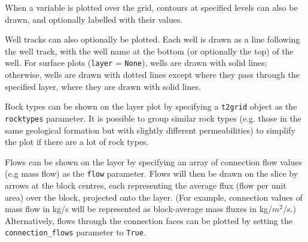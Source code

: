When a variable is plotted over the grid, contours at specified levels can also be drawn, and optionally labelled with their values.

Well tracks can also optionally be plotted.  Each well is drawn as a line following the well track, with the well name at the bottom (or optionally the top) of the well.  For surface plots (\texttt{layer} = \texttt{None}), wells are drawn with solid lines; otherwise, wells are drawn with dotted lines except where they pass through the specified layer, where they are drawn with solid lines.

Rock types can be shown on the layer plot by specifying a \texttt{t2grid} object as the \texttt{rocktypes} parameter.  It is possible to group similar rock types (e.g. those in the same geological formation but with slightly different permeabilities) to simplify the plot if there are a lot of rock types.

Flows can be shown on the layer by specifying an array of connection flow values (e.g mass flow) as the \texttt{flow} parameter.  Flows will then be drawn on the slice by arrows at the block centres, each representing the average flux (flow per unit area) over the block, projected onto the layer.  (For example, connection values of mass flow in kg/s will be represented as block-average mass fluxes in kg/$m^2$/s.)  Alternatively, flows through the connection faces can be plotted by setting the \texttt{connection\_flows} parameter to \texttt{True}.

